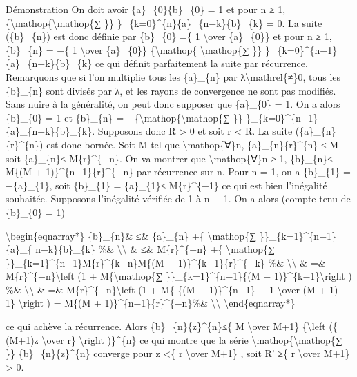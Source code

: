 \documentclass[]{article}
\begin{document}
Démonstration On doit avoir \{a\}\_\{0\}\{b\}\_\{0\} = 1 et pour n ≥ 1,
\{\textbackslash{}mathop\{\textbackslash{}mathop\{∑ \}\}
\}\_\{k=0\}\^{}\{n\}\{a\}\_\{n−k\}\{b\}\_\{k\} = 0. La suite
(\{b\}\_\{n\}) est donc définie par \{b\}\_\{0\} =\{ 1
\textbackslash{}over \{a\}\_\{0\}\} et pour n ≥ 1, \{b\}\_\{n\} = −\{ 1
\textbackslash{}over \{a\}\_\{0\}\} \{\textbackslash{}mathop\{
\textbackslash{}mathop\{∑ \}\}
\}\_\{k=0\}\^{}\{n−1\}\{a\}\_\{n−k\}\{b\}\_\{k\} ce qui définit
parfaitement la suite par récurrence. Remarquons que si l'on multiplie
tous les \{a\}\_\{n\} par λ\textbackslash{}mathrel\{≠\}0, tous les
\{b\}\_\{n\} sont divisés par λ, et les rayons de convergence ne sont
pas modifiés. Sans nuire à la généralité, on peut donc supposer que
\{a\}\_\{0\} = 1. On a alors \{b\}\_\{0\} = 1 et \{b\}\_\{n\} =
−\{\textbackslash{}mathop\{\textbackslash{}mathop\{∑ \}\}
\}\_\{k=0\}\^{}\{n−1\}\{a\}\_\{n−k\}\{b\}\_\{k\}. Supposons donc R
\textgreater{} 0 et soit r \textless{} R. La suite
(\{a\}\_\{n\}\{r\}\^{}\{n\}) est donc bornée. Soit M tel que
\textbackslash{}mathop\{∀\}n,
\textbar{}\{a\}\_\{n\}\textbar{}\{r\}\^{}\{n\} ≤ M soit
\textbar{}\{a\}\_\{n\}\textbar{}≤ M\{r\}\^{}\{−n\}. On va montrer que
\textbackslash{}mathop\{∀\}n ≥ 1, \textbar{}\{b\}\_\{n\}\textbar{}≤
M\{(M + 1)\}\^{}\{n−1\}\{r\}\^{}\{−n\} par récurrence sur n. Pour n = 1,
on a \{b\}\_\{1\} = −\{a\}\_\{1\}, soit \textbar{}\{b\}\_\{1\}\textbar{}
= \textbar{}\{a\}\_\{1\}\textbar{}≤ M\{r\}\^{}\{−1\} ce qui est bien
l'inégalité souhaitée. Supposons l'inégalité vérifiée de 1 à n − 1. On a
alors (compte tenu de \{b\}\_\{0\} = 1)

\textbackslash{}begin\{eqnarray*\} \textbar{}\{b\}\_\{n\}\textbar{}\&
≤\& \textbar{}\{a\}\_\{n\}\textbar{} +\{ \textbackslash{}mathop\{∑
\}\}\_\{k=1\}\^{}\{n−1\}\textbar{}\{a\}\_\{
n−k\}\textbar{}\textbar{}\{b\}\_\{k\}\textbar{} \%\&
\textbackslash{}\textbackslash{} \& ≤\& M\{r\}\^{}\{−n\} +\{
\textbackslash{}mathop\{∑ \}\}\_\{k=1\}\^{}\{n−1\}M\{r\}\^{}\{k−n\}M\{(M
+ 1)\}\^{}\{k−1\}\{r\}\^{}\{−k\} \%\& \textbackslash{}\textbackslash{}
\& =\& M\{r\}\^{}\{−n\}\textbackslash{}left (1 +
M\{\textbackslash{}mathop\{∑ \}\}\_\{k=1\}\^{}\{n−1\}\{(M +
1)\}\^{}\{k−1\}\textbackslash{}right ) \%\&
\textbackslash{}\textbackslash{} \& =\&
M\{r\}\^{}\{−n\}\textbackslash{}left (1 + M\{ \{(M + 1)\}\^{}\{n−1\} − 1
\textbackslash{}over (M + 1) − 1\} \textbackslash{}right ) = M\{(M +
1)\}\^{}\{n−1\}\{r\}\^{}\{−n\}\%\& \textbackslash{}\textbackslash{}
\textbackslash{}end\{eqnarray*\}

ce qui achève la récurrence. Alors
\textbar{}\{b\}\_\{n\}\{z\}\^{}\{n\}\textbar{}≤\{ M \textbackslash{}over
M+1\} \{\textbackslash{}left (\{ (M+1)\textbar{}z\textbar{}
\textbackslash{}over r\} \textbackslash{}right )\}\^{}\{n\} ce qui
montre que la série \textbackslash{}mathop\{\textbackslash{}mathop\{∑
\}\} \{b\}\_\{n\}\{z\}\^{}\{n\} converge pour \textbar{}z\textbar{}
\textless{}\{ r \textbackslash{}over M+1\} , soit R' ≥\{ r
\textbackslash{}over M+1\} \textgreater{} 0.
\end{document}
